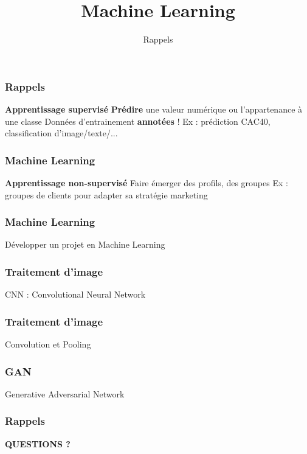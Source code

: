 \documentclass{formation}
\title{Machine Learning}
\subtitle{Rappels}
\begin{document}
\maketitle

\begin{frame}
\frametitle{Rappels}
  \textbf{Apprentissage supervisé}
  \newline \newline
  \textbf{Prédire} une valeur numérique ou l'appartenance à une classe
  \newline
  Données d'entrainement \textbf{annotées} !
  \newline \newline
  Ex : prédiction CAC40, classification d'image/texte/...
\end{frame}

\begin{frame}
  \frametitle{Machine Learning}
  \textbf{Apprentissage non-supervisé}
  \newline \newline
  Faire émerger des profils, des groupes
  \newline \newline
  Ex : groupes de clients pour adapter sa stratégie marketing
\end{frame}

\begin{frame}
  \frametitle{Machine Learning}
  \begin{center}
  Développer un projet en Machine Learning
  \end{center}
\end{frame}

\begin{frame}
  \frametitle{Traitement d'image}
  \begin{center}
    CNN : Convolutional Neural Network
  \end{center}
\end{frame}

\begin{frame}
  \frametitle{Traitement d'image}
  \begin{center}
    Convolution et Pooling
  \end{center}
  \begin{minipage}[l]{0.40\linewidth}
  \end{minipage}\hfill
  \begin{minipage}[l]{0.59\linewidth}
  \end{minipage}\hfill
\end{frame}

\begin{frame}
  \frametitle{GAN}
  \begin{center}
    Generative Adversarial Network
  \end{center}
\end{frame}

\begin{frame}
  \frametitle{Rappels}
  \begin{center}
   \textbf{QUESTIONS ?}
  \end{center}
\end{frame}
\end{document}
